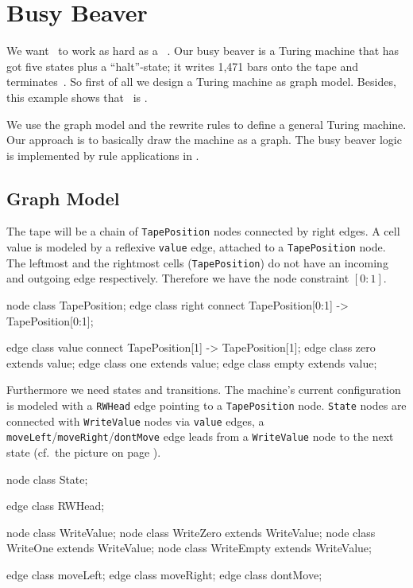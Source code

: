 \section{Busy Beaver}
We want \GrG\ to work as hard as a ~\cite{Kro:07,Dew:84}. Our busy beaver is a Turing machine that has got five states plus a ``halt''-state; it writes 1,471 bars onto the tape and terminates~\cite{MB:00}. So first of all we design a Turing machine as graph model. Besides, this example shows that \GrG\ is .

We use the graph model and the rewrite rules to define a general Turing machine. Our approach is to basically draw the machine as a graph. The busy beaver logic is implemented by rule applications in \GrShell.

\subsection{Graph Model}
The tape will be a chain of \texttt{TapePosition} nodes connected by right edges. A cell value is modeled by a reflexive \texttt{value} edge, attached to a \texttt{TapePosition} node. The leftmost and the rightmost cells (\texttt{TapePosition}) do not have an incoming and outgoing edge respectively. Therefore we have the node constraint $[0:1]$.
\begin{grgen}[firstnumber=last]
node class TapePosition; 
edge class right
  connect TapePosition[0:1] -> TapePosition[0:1];
  
edge class value
  connect TapePosition[1] -> TapePosition[1];  
edge class zero  extends value;
edge class one   extends value;
edge class empty extends value;

\end{grgen}
Furthermore we need states and transitions. 
The machine's current configuration is modeled with a \texttt{RWHead} edge pointing to a \texttt{TapePosition} node. 
\texttt{State} nodes are connected with \texttt{WriteValue} nodes via \texttt{value} edges, a \texttt{moveLeft}/\texttt{moveRight}/\texttt{dontMove} edge leads from a \texttt{WriteValue} node to the next state (cf.~the picture on page \pageref{fig:bbstart}).
\begin{grgen}[firstnumber=last]
node class State;

edge class RWHead;

node class WriteValue;
node class WriteZero extends WriteValue;
node class WriteOne extends WriteValue;
node class WriteEmpty extends WriteValue; 

edge class moveLeft;
edge class moveRight;
edge class dontMove;
\end{grgen}

